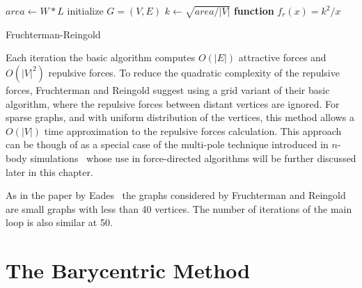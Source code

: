 \documentclass[notitlepage,letter,11pt]{article}
\begin{document}
\begin{algorithm}
$area\gets W * L$ 
initialize $G=(V,E)$ 
$k\gets \sqrt{area/|V|}$ 
{\bf function} $f_r(x) = k^2/x$ 
\caption{Fruchterman-Reingold\label{alg:FR}}
\end{algorithm}

Each iteration the basic algorithm computes $O(|E|)$ attractive forces
and $O(|V|^2)$ repulsive forces. To reduce the quadratic complexity of
the repulsive forces, Fruchterman and Reingold suggest using a grid
variant of their basic algorithm, where the repulsive forces between
distant vertices are ignored. For sparse graphs, and with uniform
distribution of the vertices, this method allows a $O(|V|)$ time
approximation to the repulsive forces calculation. This approach can
be though of as a special case of the multi-pole technique introduced
in $n$-body simulations~\cite{ref:Greengard:1988a} whose use in
force-directed algorithms will be further discussed later in this
chapter.

As in the paper by Eades~\cite{Eades+1984a} the graphs considered by
Fruchterman and Reingold are small graphs with less than 40
vertices. The number of iterations of the main loop is also similar at
50.






\section{The Barycentric Method}
\label{fd:sec:bar}
\end{document}
